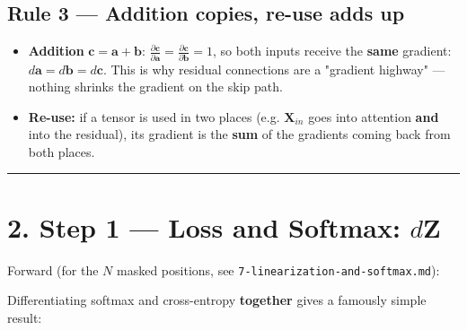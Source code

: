 \documentclass[11pt,a4paper,oneside]{report}
\providecommand{\tightlist}{\setlength{\itemsep}{0pt}\setlength{\parskip}{0pt}}
\begin{document}
\subsection{Rule 3 --- Addition copies, re-use adds up}\label{rule-3--addition-copies-re-use-adds-up}

\begin{itemize}
\tightlist
\item
  \textbf{Addition} \(\mathbf{c} = \mathbf{a} + \mathbf{b}\): \(\frac{\partial \mathbf{c}}{\partial \mathbf{a}} = \frac{\partial \mathbf{c}}{\partial \mathbf{b}} = 1\), so both inputs receive the \textbf{same} gradient: \(d\mathbf{a} = d\mathbf{b} = d\mathbf{c}\). This is why residual connections are a "gradient highway" --- nothing shrinks the gradient on the skip path.
\item
  \textbf{Re-use:} if a tensor is used in two places (e.g. \(\mathbf{X}_{in}\) goes into attention \textbf{and} into the residual), its gradient is the \textbf{sum} of the gradients coming back from both places.
\end{itemize}

\begin{center}\rule{0.5\linewidth}{0.5pt}\end{center}

\section{\texorpdfstring{2. Step 1 --- Loss and Softmax: \(d\mathbf{Z}\)}{2. Step 1 --- Loss and Softmax: d\textbackslash mathbf\{Z\}}}\label{2-step-1--loss-and-softmax-dmathbfz}

Forward (for the \(N\) masked positions, see \texttt{7-linearization-and-softmax.\allowbreak{}md}):

\begin{center}\end{center}

Differentiating softmax and cross-entropy \textbf{together} gives a famously simple result:

\begin{center}\end{center}
\end{document}
